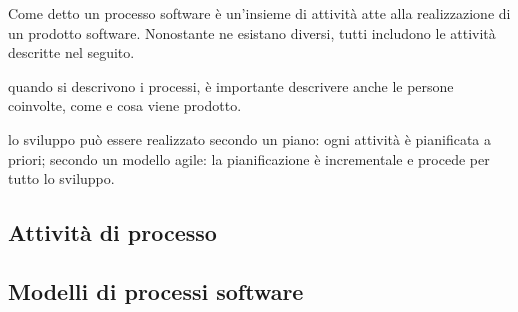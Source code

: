 \documentclass{subfiles}
\begin{document}
Come detto un processo software è un'insieme di attività atte alla realizzazione di un prodotto software.
Nonostante ne esistano diversi, tutti includono le attività descritte nel seguito.

\begin{Remark*}
    quando si descrivono i processi, è importante descrivere anche le persone coinvolte, come e cosa viene prodotto.
\end{Remark*}

\begin{Remark*}
    lo sviluppo può essere realizzato secondo un piano: ogni attività è pianificata a priori;
    secondo un modello agile: la pianificazione è incrementale e procede per tutto lo sviluppo.
\end{Remark*}

\subsection{Attività di processo}

\clearpage

\subsection{Modelli di processi software}

\end{document}
